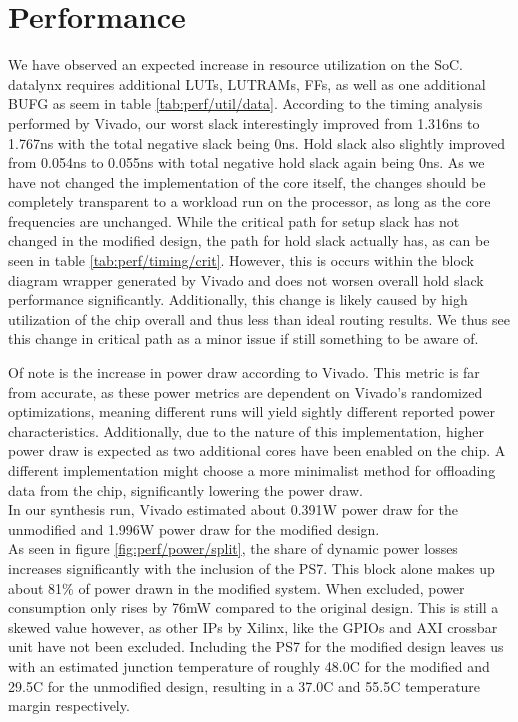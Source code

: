 \documentclass[../bachelor_paper.tex]{subfiles}
\begin{document}
\chapter{Performance}
    \label{ch:perf}
    
We have observed an expected increase in resource utilization on the \ac{SoC}. datalynx requires additional \acp{LUT}, \acsp{LUTRAM}, \acp{FF}, as well as one additional \ac{BUFG} as seem in table \ref{tab:perf/util/data}. According to the timing analysis performed by Vivado, our worst slack interestingly improved from 1.316ns to 1.767ns with the total negative slack being 0ns. Hold slack also slightly improved from 0.054ns to 0.055ns with total negative hold slack again being 0ns. As we have not changed the implementation of the core itself, the changes should be completely transparent to a workload run on the processor, as long as the core frequencies are unchanged. While the critical path for setup slack has not changed in the modified design, the path for hold slack actually has, as can be seen in table \ref{tab:perf/timing/crit}. However, this is occurs within the block diagram wrapper generated by Vivado and does not worsen overall hold slack performance significantly. Additionally, this change is likely caused by high utilization of the chip overall and thus less than ideal routing results. We thus see this change in critical path as a minor issue if still something to be aware of.

Of note is the increase in power draw according to Vivado. This metric is far from accurate, as these power metrics are dependent on Vivado's randomized optimizations, meaning different runs will yield sightly different reported power characteristics. Additionally, due to the nature of this implementation, higher power draw is expected as two additional cores have been enabled on the chip. A different implementation might choose a more minimalist method for offloading data from the chip, significantly lowering the power draw.\\
In our synthesis run, Vivado estimated about 0.391W power draw for the unmodified and 1.996W power draw for the modified design. \\
As seen in figure \ref{fig:perf/power/split}, the share of dynamic power losses increases significantly with the inclusion of the \ac{PS7}. This block alone makes up about 81\% of power drawn in the modified system. When excluded, power consumption only rises by 76mW compared to the original design. This is still a skewed value however, as other \acp{IP} by Xilinx, like the GPIOs and AXI crossbar unit have not been excluded. Including the \ac{PS7} for the modified design leaves us with an estimated junction temperature of roughly 48.0\textdegree C for the modified and 29.5\textdegree C for the unmodified design, resulting in a 37.0\textdegree C and 55.5\textdegree C temperature margin respectively.
\end{document}
